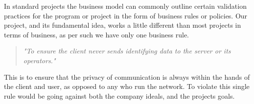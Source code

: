 In standard projects the business model can commonly outline certain validation 
practices for the program or project in the form of business rules or policies. 
Our project, and its fundamental idea, works a little different than most 
projects in terms of business, as per such we have only one business rule.

\begin{quote}
\centering
\textit{"To ensure the client never sends identifying data to the server or its 
operators."}
\end{quote}

This is to ensure that the privacy of communication is always within the hands 
of the client and user, as opposed to any who run the network. To violate this 
single rule would be going against both the company ideals, and the projects 
goals.
